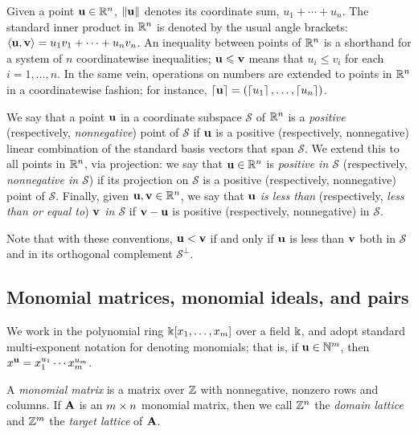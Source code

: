 \documentclass{amsart}
\begin{document}
Given a point $\mathbf{u}\in \mathbb{R}^n$, $\| \mathbf{u} \|$ denotes its coordinate sum, $u_1+\cdots+u_n$.
The standard inner product in $\mathbb{R}^n$ is denoted by the usual angle brackets: $\langle \mathbf{u}, \mathbf{v} \rangle = u_1v_1 + \cdots + u_nv_n$.
An inequality between points of $\mathbb{R}^n$ is a shorthand for a system of $n$ coordinatewise inequalities; \eg $\mathbf{u}\leqslant \mathbf{v}$ means that $u_i \le v_i$ for each $i=1,\ldots,n$.
In the same vein, operations on numbers are extended to points in $\mathbb{R}^n$ in a coordinatewise fashion; for instance, $\left\lceil \mathbf{u} \right\rceil=(\left\lceil u_1 \right\rceil,\ldots,\left\lceil u_n \right\rceil)$.

We say that a point $\mathbf{u}$ in a coordinate subspace $\mathcal{S}$ of $\mathbb{R}^n$ is a \emph{positive} (respectively, \emph{nonnegative}) point of $\mathcal{S}$ if $\mathbf{u}$ is a positive (respectively, nonnegative) linear combination of the standard basis vectors that span $\mathcal{S}$.
We extend this to all points in $\mathbb{R}^n$, via projection: we say that $\mathbf{u} \in \mathbb{R}^n$ is \emph{positive in $\mathcal{S}$} (respectively, \emph{nonnegative in $\mathcal{S}$}) if its projection on $\mathcal{S}$ is a positive (respectively, nonnegative) point of $\mathcal{S}$.
Finally, given $\mathbf{u},\mathbf{v}\in \mathbb{R}^n$, we say that \emph{$\mathbf{u}$ is less than} (respectively, \emph{less than or equal to}) \emph{$\mathbf{v}$ in $\mathcal{S}$} if $\mathbf{v}-\mathbf{u}$ is positive (respectively, nonnegative) in $\mathcal{S}$.

Note that with these conventions, $\mathbf{u} < \mathbf{v}$ if and only if $\mathbf{u}$ is less than $\mathbf{v}$ both in $\mathcal{S}$ and in its orthogonal complement $\mathcal{S}^\perp$.

\subsection{Monomial matrices, monomial ideals, and pairs}
\label{monomial newton preliminaries: ss}

We work in the polynomial ring $\Bbbk[x_1, \ldots, x_m]$ over a field $\Bbbk$, and adopt standard multi-exponent notation for denoting monomials; that is, if $\mathbf{u} \in \mathbb{N}^m$, then $x^{\mathbf{u}} = x_1^{u_1} \cdots x_m^{u_m}$.

\begin{definition}
\label{monomial matrix: D}
A \emph{monomial matrix} is a matrix over $\mathbb{Z}$ with nonnegative, nonzero rows and columns.
If $\mathbf{A}$ is an $m \times n$ monomial matrix, then we call $\mathbb{Z}^n$ the \emph{domain lattice} and $\mathbb{Z}^m$ the \emph{target lattice} of $\mathbf{A}$.
\end{definition}
\end{document}
